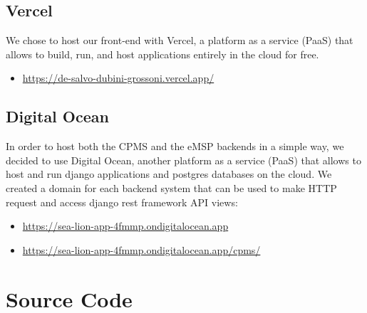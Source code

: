 \documentclass[table, 12pt]{article}
\begin{document}
\subsection{Vercel}
We chose to host our front-end with Vercel, a platform as a service (PaaS) that allows
to build, run, and host applications entirely in the cloud for free.
\begin{itemize}
    \item \url{https://de-salvo-dubini-grossoni.vercel.app/}
\end{itemize}


\subsection{Digital Ocean}
In order to host both the CPMS and the eMSP backends in a simple way, we decided to 
use Digital Ocean, another platform as a service (PaaS) that allows to host and run django applications and postgres databases on the cloud.
We created a domain for each backend system that can be used to make HTTP request and access django rest framework API views:
\begin{itemize}
    \item \url{https://sea-lion-app-4fmmp.ondigitalocean.app}
    \item \url{https://sea-lion-app-4fmmp.ondigitalocean.app/cpms/}
\end{itemize}

\section{Source Code}
\end{document}

